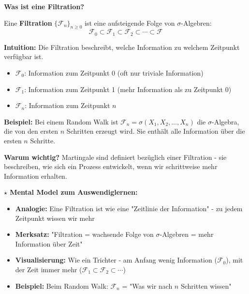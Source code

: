 \begin{denoobification}[Filtration]
\textbf{Was ist eine Filtration?}

Eine \textbf{Filtration} $\{\mathcal{F}_n\}_{n \geq 0}$ ist eine aufsteigende Folge von $\sigma$-Algebren:
\[
\mathcal{F}_0 \subset \mathcal{F}_1 \subset \mathcal{F}_2 \subset \cdots \subset \mathcal{F}
\]

\textbf{Intuition:} Die Filtration beschreibt, welche Information zu welchem Zeitpunkt verfügbar ist.
\begin{itemize}
    \item $\mathcal{F}_0$: Information zum Zeitpunkt 0 (oft nur triviale Information)
    \item $\mathcal{F}_1$: Information zum Zeitpunkt 1 (mehr Information als zu Zeitpunkt 0)
    \item $\mathcal{F}_n$: Information zum Zeitpunkt $n$
\end{itemize}

\textbf{Beispiel:} Bei einem Random Walk ist $\mathcal{F}_n = \sigma(X_1, X_2, \ldots, X_n)$ die $\sigma$-Algebra, die von den ersten $n$ Schritten erzeugt wird. Sie enthält alle Information über die ersten $n$ Schritte.

\textbf{Warum wichtig?} Martingale sind definiert bezüglich einer Filtration - sie beschreiben, wie sich ein Prozess entwickelt, wenn wir schrittweise mehr Information erhalten.

\textbf{$\star$ Mental Model zum Auswendiglernen:}
\begin{itemize}
    \item \textbf{Analogie:} Eine Filtration ist wie eine "Zeitlinie der Information" - zu jedem Zeitpunkt wissen wir mehr
    \item \textbf{Merksatz:} "Filtration = wachsende Folge von $\sigma$-Algebren = mehr Information über Zeit"
    \item \textbf{Visualisierung:} Wie ein Trichter - am Anfang wenig Information ($\mathcal{F}_0$), mit der Zeit immer mehr ($\mathcal{F}_1 \subset \mathcal{F}_2 \subset \cdots$)
    \item \textbf{Beispiel:} Beim Random Walk: $\mathcal{F}_n$ = "Was wir nach $n$ Schritten wissen"
\end{itemize}

\begin{center}
\end{center}
\end{denoobification}
